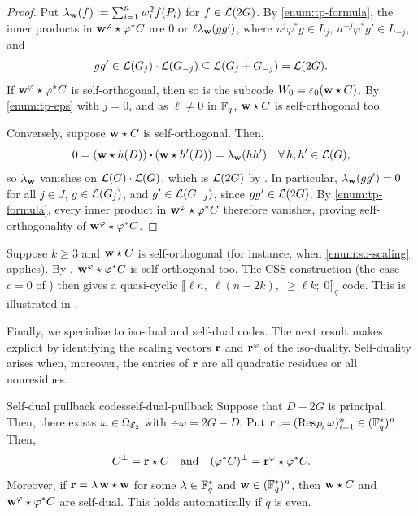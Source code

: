 \documentclass[twocolumn, 11pt]{scrartcl}
\begin{document}
\begin{proof}
    Put $\lambda_\mathbf{w}(f):=\sum_{i=1}^nw_i^2f(P_i)$ for $f\in\mathcal{L}(2G)$. By \ref{enum:tp-formula}, the inner products in $\mathbf{w}^\varphi\star \varphi^*C$ are $0$ or $\ell\lambda_\mathbf{w}(gg')$, where $u^j\varphi^*g\in L_j$, $u^{-j}\varphi^*g'\in L_{-j}$, and
    \[ gg'\in\mathcal{L}(G_j)\cdot\mathcal{L}(G_{-j})\subseteq\mathcal{L}(G_j+G_{-j})=\mathcal{L}(2G). \]
    If $\mathbf{w}^\varphi\star \varphi^*C$ is self-orthogonal, then so is the subcode $W_0=\varepsilon_0(\mathbf{w}\star C)$. By \ref{enum:tp-eps} with $j=0$, and as $\ell\neq0$ in $\mathbb{F}_q$, $\mathbf{w}\star C$ is self-orthogonal too. 
    
    Conversely, suppose $\mathbf{w}\star C$ is self-orthogonal. Then,
    \[ 0=(\bfw\star h(D))\dotpr(\bfw\star h'(D))=\lambda_\bfw(hh') \quad\forall h,h'\in\mcL(G),\]
    so $\lambda_\mathbf{w}$ vanishes on $\mathcal{L}(G)\cdot\mathcal{L}(G)$, which is $\mathcal{L}(2G)$ by \cite[Thm.~6]{mumford1970varieties}. In particular, $\lambda_\mathbf{w}(gg')=0$ for all $j\in J$, $g\in\mathcal{L}(G_j)$, and $g'\in\mathcal{L}(G_{-j})$, since $gg'\in\mathcal{L}(2G)$. By \ref{enum:tp-formula}, every inner product in $\mathbf{w}^\varphi\star\varphi^*C$ therefore vanishes, proving self-orthogonality of $\mathbf{w}^\varphi\star \varphi^*C$.
\end{proof}

Suppose $k\geq3$ and $\mathbf{w}\star C$ is self-orthogonal (for instance, when \ref{enum:so-scaling} applies). By , $\mathbf{w}^\varphi\star\varphi^*C$ is self-orthogonal too. The CSS construction \cite{ketkar2006nonbinary} (the case $c=0$ of ) then gives a quasi-cyclic $\llbracket \ell n,\;\ell(n-2k),\;\geq\ell k;\;0\rrbracket_q$ code. This is illustrated in .

Finally, we specialise to iso-dual and self-dual codes. The next result makes  explicit by identifying the scaling vectors $\mathbf{r}$ and $\mathbf{r}^\varphi$ of the iso-duality. Self-duality arises when, moreover, the entries of $\mathbf{r}$ are all quadratic residues or all nonresidues.

\begin{proposition}{Self-dual pullback codes}{self-dual-pullback}
    Suppose that $D-2G$ is principal. Then, there exists $\omega\in\Omega_{\mathcal{E}_2}$ with $\div\omega=2G-D$. Put $\mathbf{r}:=(\operatorname{Res}_{P_i}\omega)_{i=1}^n\in(\mathbb{F}_q^*)^n$. Then,
    \[ C^\perp=\mathbf{r}\star C\quad\text{and}\quad (\varphi^*C)^\perp=\mathbf{r}^\varphi\star \varphi^*C. \]
    Moreover, if $\mathbf{r}=\lambda\,\mathbf{w}\star\mathbf{w}$ for some $\lambda\in\mathbb{F}_q^*$ and $\mathbf{w}\in(\mathbb{F}_q^*)^n$, then $\mathbf{w}\star C$ and $\mathbf{w}^\varphi\star \varphi^*C$ are self-dual. This holds automatically if $q$ is even.
\end{proposition}
\end{document}
